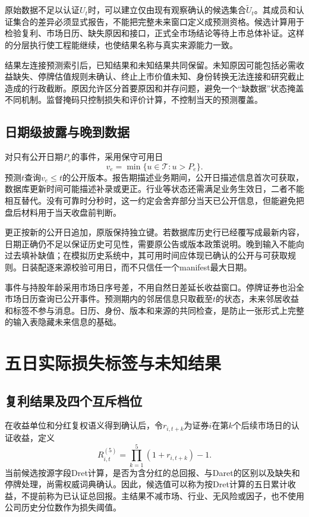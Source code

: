 原始数据不足以认证$U_t$时，可以建立仅由现有观察确认的候选集合$\widetilde U_t$。其成员和认证集合的差异必须显式报告，不能把完整未来窗口定义成预测资格。候选计算用于检验复利、市场日历、缺失原因和接口，正式全市场结论等待上市总体补证。这样的分层执行使工程能继续，也使结果名称与真实来源能力一致。

结果左连接预测索引后，已知结果和未知结果共同保留。未知原因可能包括必需收益缺失、停牌估值规则未确认、终止上市价值未知、身份转换无法连接和研究截止造成的行政截断。原因允许区分首要原因和并存问题，避免一个“缺数据”状态掩盖不同机制。监督掩码只控制损失和评价计算，不控制当天的预测覆盖。

\subsection{日期级披露与晚到数据}
对只有公开日期$P_e$的事件，采用保守可用日
\begin{equation}
 v_e=\min\{u\in\mathcal T:u>P_e\}.
\end{equation}
预测$t$查询$v_e\le t$的公开版本。报告期描述业务期间，公开日描述信息首次可获取，数据库更新时间可能描述补录或更正。行业等状态还需满足业务生效日，二者不能相互替代。没有可靠时分秒时，这一约定会舍弃部分当天已公开信息，但能避免把盘后材料用于当天收盘前判断。


更正按新的公开日追加，原版保持独立键。若数据库历史行已经覆写成最新内容，日期正确仍不足以保证历史可见性，需要原公告或版本政策说明。晚到输入不能向过去填补缺值；在模拟历史系统中，其可用时间应体现已确认的公开与可获取规则。日装配逐来源校验可用日，而不只信任一个manifest最大日期。

事件与持股年龄采用市场日序号差，不用自然日差延长收益窗口。停牌证券也沿全市场日历查询已公开事件。预测期内的邻居信息只取截至$t$的状态，未来邻居收益和标签不参与消息。日历、身份、版本和来源的共同检查，是防止一张形式上完整的输入表隐藏未来信息的基础。

\section{五日实际损失标签与未知结果}
\subsection{复利结果及四个互斥档位}
在收益单位和分红复权语义得到确认后，令$r_{i,t+k}$为证券$i$在第$k$个后续市场日的认证收益，定义
\begin{equation}
 R_{i,t}^{(5)}=\prod_{k=1}^{5}(1+r_{i,t+k})-1.
 \label{eq:actualreturn}
\end{equation}
当前候选按源字段Dret计算，是否为含分红的总回报、与Daret的区别以及缺失和停牌处理，尚需权威词典确认。因此，候选值可以称为按Dret计算的五日累计收益，不提前称为已认证总回报。主结果不减市场、行业、无风险或因子，也不使用公司历史分位数作为损失阈值。


